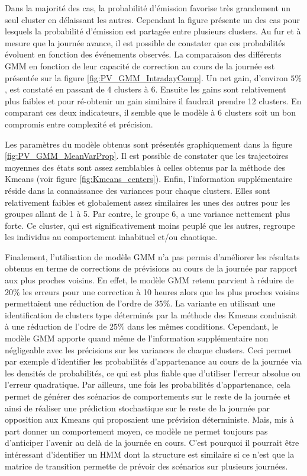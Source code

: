 \documentclass[12pt, french]{report}
\begin{document}
Dans la majorité des cas, la probabilité d'émission favorise très grandement un seul cluster en délaissant les autres. Cependant la figure présente un des cas pour lesquels la probabilité d'émission est partagée entre plusieurs clusters. Au fur et à mesure que la journée avance, il est possible de constater que ces probabilités évoluent en fonction des événements observés. La comparaison des différents GMM en fonction de leur capacité de correction au cours de la journée est présentée sur la figure \ref{fig:PV_GMM_IntradayComp}. Un net gain, d'environ $5\%$, est constaté en passant de 4 clusters à 6. Ensuite les gains sont relativement plus faibles et pour ré-obtenir un gain similaire il faudrait prendre 12 clusters. En comparant ces deux indicateurs, il semble que le modèle à 6 clusters soit un bon compromis entre complexité et précision.




Les paramètres du modèle obtenus sont présentés graphiquement dans la figure \ref{fig:PV_GMM_MeanVarProp}. Il est possible de constater que les trajectoires moyennes des états sont assez semblables à celles obtenus par la méthode des Kmeans (voir figure \ref{fig:Kmeans_centers}). Enfin, l'information supplémentaire réside dans la connaissance des variances pour chaque clusters. Elles sont relativement faibles et globalement assez similaires les unes des autres pour les groupes allant de 1 à 5. Par contre, le groupe 6, a une variance nettement plus forte. Ce cluster, qui est significativement moins peuplé que les autres, regroupe les individus au comportement inhabituel et/ou chaotique.




Finalement, l'utilisation de modèle GMM n'a pas permis d'améliorer les résultats obtenus en terme de corrections de prévisions au cours de la journée par rapport aux plus proches voisins. En effet, le modèle GMM retenu parvient à réduire de $20 \%$ les erreurs pour une correction à 10 heures alors que les plus proches voisins permettaient une réduction de l'ordre de $35 \%$. La variante en utilisant une identification de clusters type déterminés par la méthode des Kmeans conduisait à une réduction de l'odre de $25 \%$ dans les mêmes conditions. Cependant, le modèle GMM apporte quand même de l'information supplémentaire non négligeable avec les précisions sur les variances de chaque clusters. Ceci permet par exemple d'identifier les probabilités d'appartenance au cours de la journée via les densités de probabilités, ce qui est plus fiable que d'utiliser l'erreur absolue ou l'erreur quadratique. Par ailleurs, une fois les probabilités d'appartenance, cela permet de générer des scénarios de comportements sur le reste de la journée et ainsi de réaliser une prédiction stochastique sur le reste de la journée par opposition aux Kmeans qui proposaient une prévision déterministe. Mais, mis à part donner un comportement moyen, ce modèle ne permet toujours pas d'anticiper l'avenir au delà de la journée en cours. C'est pourquoi il pourrait être intéressant d'identifier un HMM dont la structure est similaire si ce n'est que la matrice de transition permette de prévoir des scénarios sur plusieurs journées.  
\end{document}
